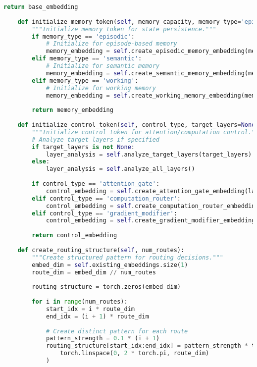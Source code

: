 \begin{lstlisting}[language=Python, caption=Advanced embedding initialization strategies]
        return base_embedding
    
    def initialize_memory_token(self, memory_capacity, memory_type='episodic'):
        """Initialize memory token for state persistence."""
        if memory_type == 'episodic':
            # Initialize for episode-based memory
            memory_embedding = self.create_episodic_memory_embedding(memory_capacity)
        elif memory_type == 'semantic':
            # Initialize for semantic memory
            memory_embedding = self.create_semantic_memory_embedding(memory_capacity)
        elif memory_type == 'working':
            # Initialize for working memory
            memory_embedding = self.create_working_memory_embedding(memory_capacity)
        
        return memory_embedding
    
    def initialize_control_token(self, control_type, target_layers=None):
        """Initialize control token for attention/computation control."""
        # Analyze target layers if specified
        if target_layers is not None:
            layer_analysis = self.analyze_target_layers(target_layers)
        else:
            layer_analysis = self.analyze_all_layers()
        
        if control_type == 'attention_gate':
            control_embedding = self.create_attention_gate_embedding(layer_analysis)
        elif control_type == 'computation_router':
            control_embedding = self.create_computation_router_embedding(layer_analysis)
        elif control_type == 'gradient_modifier':
            control_embedding = self.create_gradient_modifier_embedding(layer_analysis)
        
        return control_embedding
    
    def create_routing_structure(self, num_routes):
        """Create structured pattern for routing decisions."""
        embed_dim = self.existing_embeddings.size(1)
        route_dim = embed_dim // num_routes
        
        routing_structure = torch.zeros(embed_dim)
        
        for i in range(num_routes):
            start_idx = i * route_dim
            end_idx = (i + 1) * route_dim
            
            # Create distinct pattern for each route
            pattern_strength = 0.1 * (i + 1)
            routing_structure[start_idx:end_idx] = pattern_strength * torch.sin(
                torch.linspace(0, 2 * torch.pi, route_dim)
            )
        

\end{lstlisting}
